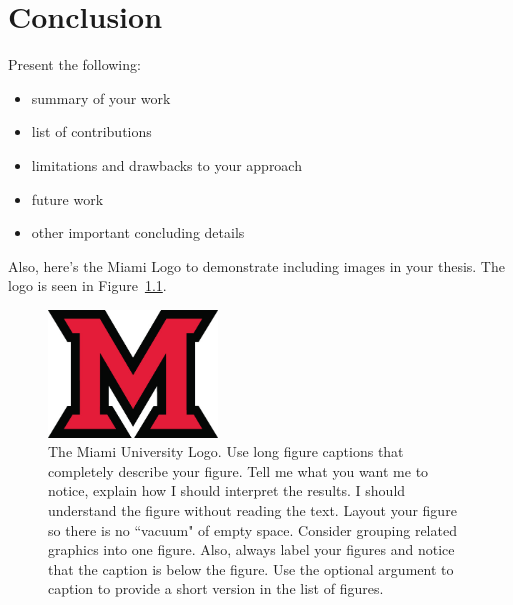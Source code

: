 \chapter{Conclusion}

Present the following:
\begin{itemize}
    \item summary of your work
    \item list of contributions
    \item limitations and drawbacks to your approach
    \item future work
    \item other important concluding details
\end{itemize}

Also, here's the Miami Logo to demonstrate including images in your thesis. The logo is seen in Figure~\ref{fig:MiamiLogo}.

\begin{figure}[h]
\centering
\includegraphics[width=0.4\textwidth]{Figures/Miami.jpg}
\caption[Miami University]{The Miami University Logo. Use long figure captions that completely describe your figure. Tell me what you want me to notice, explain how I should interpret the results. I should understand the figure without reading the text. Layout your figure so there is no ``vacuum" of empty space. Consider grouping related graphics into one figure.  Also, always label your figures and notice that the caption is below the figure. Use the optional argument to caption to provide a short version in the list of figures. }
\label{fig:MiamiLogo}
\end{figure}


